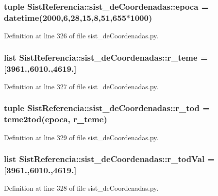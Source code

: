\subsubsection[{epoca}]{\setlength{\rightskip}{0pt plus 5cm}tuple {\bf \-Sist\-Referencia\-::sist\-\_\-de\-Coordenadas\-::epoca} = datetime(2000,6,28,15,8,51,655$\ast$1000)}\label{namespace_sist_referencia_1_1sist__de_coordenadas_a5b1ef879add4bc0afc576033b8c65bf9}


\-Definition at line 326 of file sist\-\_\-de\-Coordenadas.\-py.

\subsubsection[{r\-\_\-teme}]{\setlength{\rightskip}{0pt plus 5cm}list {\bf \-Sist\-Referencia\-::sist\-\_\-de\-Coordenadas\-::r\-\_\-teme} = [3961.,6010.,4619.]}\label{namespace_sist_referencia_1_1sist__de_coordenadas_afff457861437508005c437a8ca938e69}


\-Definition at line 327 of file sist\-\_\-de\-Coordenadas.\-py.

\subsubsection[{r\-\_\-tod}]{\setlength{\rightskip}{0pt plus 5cm}tuple {\bf \-Sist\-Referencia\-::sist\-\_\-de\-Coordenadas\-::r\-\_\-tod} = {\bf teme2tod}({\bf epoca}, {\bf r\-\_\-teme})}\label{namespace_sist_referencia_1_1sist__de_coordenadas_a62aae6ec02c7834cb0f5b4aeafb763e3}


\-Definition at line 329 of file sist\-\_\-de\-Coordenadas.\-py.

\subsubsection[{r\-\_\-tod\-Val}]{\setlength{\rightskip}{0pt plus 5cm}list {\bf \-Sist\-Referencia\-::sist\-\_\-de\-Coordenadas\-::r\-\_\-tod\-Val} = [3961.,6010.,4619.]}\label{namespace_sist_referencia_1_1sist__de_coordenadas_abfd44e8a22ea6251de2241c7899332e2}


\-Definition at line 328 of file sist\-\_\-de\-Coordenadas.\-py.

